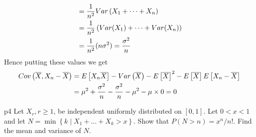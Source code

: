 \documentclass[a4paper, 11pt]{article}
\begin{document}
{\begin{align*}
		                          & = \frac1{n^2}Var\left(X_1+\cdots+X_n\right)                                 \\
		                          & = \frac1{n^2}\left(Var(X_1)+\cdots+Var(X_n)\right)                          \\
		                          & =\frac1{n^2}(n\sigma^2)=\frac{\sigma^2}{n}
	\end{align*}
	Hence putting these values we get\begin{align*}
		Cov\left(\overline{X},X_n-\overline{X}\right) & =E\left[X_n\overline{X}\right]-Var\left(\overline{X}\right)-E\left[\overline{X}\right]^2-E\left[\overline{X}\right]E\left[X_n-\overline{X}\right] \\
		                                         & =\mu^2+\frac{\sigma^2}{n}-\frac{\sigma^2}{n}-\mu^2-\mu\times 0=0
	\end{align*}
}



\begin{problem}{%
}{p4%
}
Let $X_{r}, r \geq 1$, be independent uniformly distributed on $[0,1]$. Let $0<x<1$ and let $N=\min \left\{k \mid X_{1}+\ldots+X_{k}>x\right\}$. Show that $P(N>n)=x^{n} / n !$. Find the mean and variance of $N$.
\end{problem}
\end{document}
